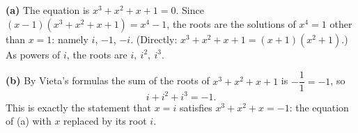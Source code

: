 \textbf{(a)} The equation is $x^3+x^2+x+1=0$. Since $(x-1)(x^3+x^2+x+1)=x^4-1$, the roots are the solutions of $x^4=1$ other than $x=1$: namely $i$, $-1$, $-i$. (Directly: $x^3+x^2+x+1=(x+1)(x^2+1)$.) As powers of $i$, the roots are $\boxed{i,\ i^2,\ i^3}$.

\textbf{(b)} By Vieta's formulas the sum of the roots of $x^3+x^2+x+1$ is $-\dfrac{1}{1}=-1$, so
\[i+i^2+i^3=-1 .\]
This is exactly the statement that $x=i$ satisfies $x^3+x^2+x=-1$: the equation of (a) with $x$ replaced by its root $i$.
